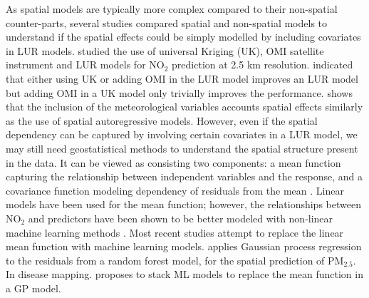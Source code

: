 \documentclass{article}
\begin{document}
As spatial models are typically more complex compared to their non-spatial counter-parts, several studies compared spatial and non-spatial models to understand if the spatial effects could be simply modelled by including covariates in LUR models. \cite{young2016satellite} studied the use of universal Kriging (UK), OMI satellite instrument \citep{OMI} and LUR models for NO$_2$ prediction at 2.5 km resolution. \cite{young2016satellite} indicated that either using UK or adding OMI in the LUR model improves an LUR model but adding OMI in a UK model only trivially improves the performance. \cite{BERTAZZON20159} shows that the inclusion of the meteorological variables accounts spatial effects similarly as the use of spatial autoregressive models. However, even if the spatial dependency can be captured by involving certain covariates in a LUR model, we may still need geostatistical methods to understand the spatial structure present in the data. It can be viewed as consisting two components: a mean function capturing the relationship between independent variables and the response, and a covariance function modeling dependency of residuals from the mean \citep{stackinla}. Linear models have been used for the mean function; however, the relationships between NO$_2$ and predictors have been shown to be better modeled with non-linear machine learning methods \citep{luglobal}. Most recent studies attempt to replace the linear mean function with machine learning models. \cite{liu2020integrate} applies Gaussian process regression to the residuals from a random forest model, for the spatial prediction of PM$_2.5$. In disease mapping. \cite{stackinla} proposes to stack ML models to replace the mean function in a GP model.   
\end{document}
